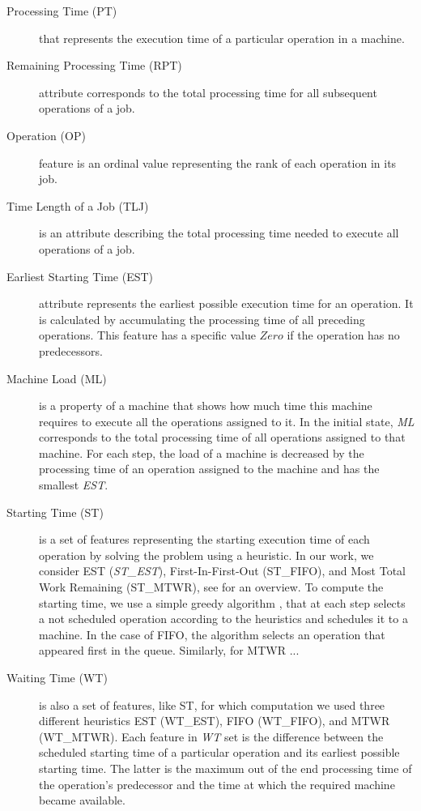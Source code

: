 \documentclass[runningheads]{llncs}
\newcommand{\stest}{\textit{ST\_EST}}
\begin{document}
\begin{description}
  \item[Processing Time (PT)] that represents the execution time of a particular operation in a machine.
  
  \item[Remaining Processing Time (RPT)] attribute corresponds to the total processing time for all subsequent operations of a job.
  
  \item[Operation (OP)] feature is an ordinal value representing the rank of each operation in its job.
  
  \item[Time Length of a Job (TLJ)] is an attribute describing the total processing time needed to execute all operations of a job. 
  
  \item[Earliest Starting Time (EST)] attribute represents the earliest possible execution time for an operation. It is calculated by accumulating the processing time of all preceding operations. This feature has a specific value $\mathit{Zero}$ if the operation has no predecessors.
  
  \item[Machine Load (ML)] is a property of a machine that shows how much time this machine requires to execute all the operations assigned to it. In the initial state, \textit{ML} corresponds to the total processing time of all operations assigned to that machine. For each step, the load of a machine is decreased by the processing time of an operation assigned to the machine and has the smallest \textit{EST}.
  
  \item[Starting Time (ST)] is a set of features representing the starting execution time of each operation by solving the problem using a heuristic. In our work, we consider EST (\stest), First-In-First-Out (ST\_FIFO), and Most Total Work Remaining (ST\_MTWR), see \cite{overview} for an overview.
  To compute the starting time, we use a simple greedy algorithm \cite{tassel2021reinforcement,el2020job}, that at each step selects a not scheduled operation according to the heuristics and schedules it to a machine. In the case of FIFO, the algorithm selects an operation that appeared first in the queue. Similarly, for MTWR ...

  \item[Waiting Time (WT)] is also a set of features, like ST, for which computation we used three different heuristics EST (WT\_EST), FIFO (WT\_FIFO), and MTWR (WT\_MTWR). Each feature in \textit{WT} set is the difference between the scheduled starting time of a particular operation and its earliest possible starting time. The latter is the maximum out of the end processing time of the operation's predecessor and the time at which the required machine became available.
\end{description}
\end{document}
